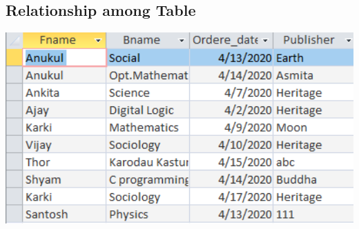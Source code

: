 \documentclass[17pt,a4paper,oneside,margin=1in]{article}
\begin{document}
\subsection{Relationship among Table}
\includegraphics[width=1\textwidth]{./scrot/relation.png}
\end{document}
